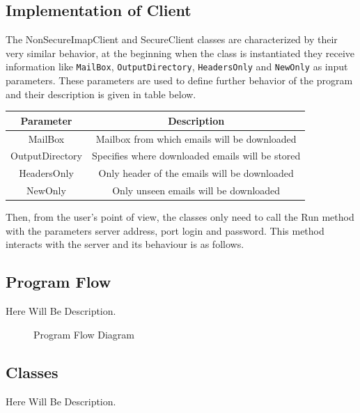 \documentclass[a4paper,11pt]{article}
\begin{document}
\subsection{Implementation of Client}
The NonSecureImapClient and SecureClient classes are characterized by their very 
similar behavior, at the beginning when the class is instantiated they receive information 
like \verb!MailBox!, \verb!OutputDirectory!, \verb!HeadersOnly! and \verb!NewOnly! as input parameters. 
These parameters are used to define further behavior of the program and their description is given in table below.

\smallskip

\begin{center}
    \vspace{0.5cm} %
    \begin{tabular}{|c|c|}
        \hline
        \textbf{Parameter} & \textbf{Description} \\
        \hline
        MailBox & Mailbox from which emails will be downloaded \\
        \hline
        OutputDirectory & Specifies where downloaded emails will be stored \\
        \hline
        HeadersOnly & Only header of the emails will be downloaded \\
        \hline
        NewOnly & Only unseen emails will be downloaded \\
        \hline
    \end{tabular}
    \vspace{0.5cm} %
\end{center}

Then, from the user's point of view, the classes only need to call the Run method with the parameters 
server address, port login and password. This method interacts with the server and its behaviour is as follows.

\newpage
\subsection{Program Flow}
Here Will Be Description.

\begin{figure}[H]
    \centering
    \caption{Program Flow Diagram}
    \label{figure:program-flow-diagram}
\end{figure}

\newpage
\subsection{Classes}
Here Will Be Description.
\end{document}
